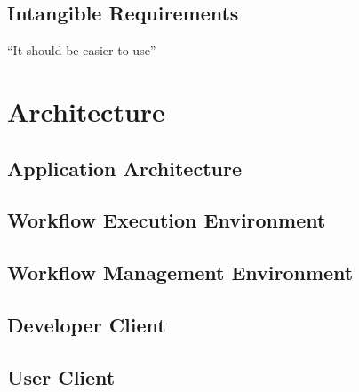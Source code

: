 \documentclass[language=english,noinputenc]{wiwwuwordrprt}
\begin{document}

      \subsection{Intangible Requirements} %
      \label{sub:intangible_requirements}
        ``It should be easier to use''
    
    
    \section{Architecture} %
    \label{sec:architecture}
      \subsection{Application Architecture} %
      \label{sub:application_architecture}
      
      \subsection{Workflow Execution Environment} %
      \label{sub:workflow_execution_environment}
      
      \subsection{Workflow Management Environment} %
      \label{sub:workflow_management}
      
      \subsection{Developer Client} %
      \label{sub:developer_client}
      

      \subsection{User Client} %
      \label{sub:user_client}
      
    
\end{document}
